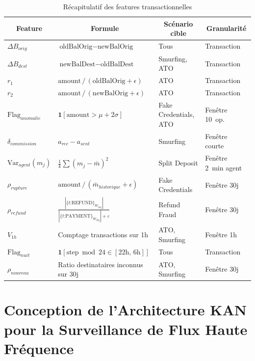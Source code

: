 \documentclass[11pt,a4paper,oneside]{report}
\theoremstyle{definition}
\theoremstyle{remark}
\begin{document}
\begin{table}[htbp]
\centering
\small
\caption{Récapitulatif des features transactionnelles}
\label{tab:features_transactionnelles}
\renewcommand{\arraystretch}{1.5}
\begin{tabular}{@{}
  p{2.4cm}
  p{4.8cm}
  p{3.0cm}
  p{2.8cm}
@{}}
\toprule
\multicolumn{1}{c}{\textbf{Feature}}
  & \multicolumn{1}{c}{\textbf{Formule}}
  & \multicolumn{1}{c}{\textbf{Scénario cible}}
  & \multicolumn{1}{c}{\textbf{Granularité}} \\
\midrule
$\Delta B_{orig}$
  & $\text{oldBalOrig} - \text{newBalOrig}$
  & Tous
  & Transaction \\
$\Delta B_{dest}$
  & $\text{newBalDest} - \text{oldBalDest}$
  & Smurfing, ATO
  & Transaction \\
$r_1$
  & $\text{amount}\,/\,(\text{oldBalOrig} + \epsilon)$
  & ATO
  & Transaction \\
$r_2$
  & $\text{amount}\,/\,(\text{newBalOrig} + \epsilon)$
  & ATO
  & Transaction \\
$\text{Flag}_{anomalie}$
  & $\mathbf{1}[\text{amount} > \mu + 2\sigma]$
  & Fake Credentials, ATO
  & Fenêtre 10~op. \\
$\delta_{commission}$
  & $a_{rec} - a_{sent}$
  & Smurfing
  & Fenêtre courte \\
$\text{Var}_{agent}(m_j)$
  & $\frac{1}{k}\sum(m_j - \bar{m})^2$
  & Split Deposit
  & Fenêtre 2~min agent \\
$\rho_{rupture}$
  & $\text{amount}\,/\,(\bar{m}_{historique} + \epsilon)$
  & Fake Credentials
  & Fenêtre 30j \\
$\rho_{refund}$
  & $\tfrac{|\{t\text{:REFUND}\}_{W_{30j}}|}{|\{t\text{:PAYMENT}\}_{W_{30j}}| + \varepsilon}$
  & Refund Fraud
  & Fenêtre 30j \\
$V_{1h}$
  & Comptage transactions sur 1h
  & ATO, Smurfing
  & Fenêtre 1h \\
$\text{Flag}_{nuit}$
  & $\mathbf{1}[\text{step} \bmod 24 \!\in\! [22\text{h},\,6\text{h}]]$
  & Tous
  & Transaction \\
$\rho_{nouveau}$
  & Ratio destinataires inconnus sur 30j
  & ATO, Smurfing
  & Fenêtre 30j \\
\bottomrule
\end{tabular}
\end{table}

\chapter{Conception de l'Architecture KAN pour la Surveillance de Flux Haute Fréquence}
\end{document}
